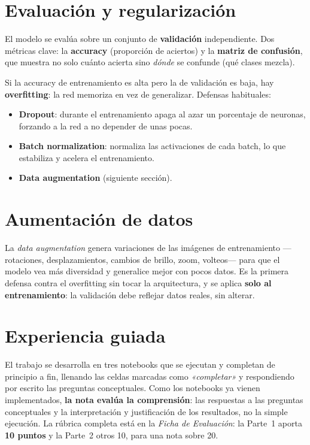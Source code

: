 \section{Evaluación y regularización}

El modelo se evalúa sobre un conjunto de \textbf{validación} independiente. Dos métricas
clave: la \textbf{accuracy} (proporción de aciertos) y la \textbf{matriz de confusión}, que
muestra no solo cuánto acierta sino \emph{dónde} se confunde (qué clases mezcla).

Si la accuracy de entrenamiento es alta pero la de validación es baja, hay
\textbf{overfitting}: la red memoriza en vez de generalizar. Defensas habituales:

\begin{itemize}
  \item \textbf{Dropout}: durante el entrenamiento apaga al azar un porcentaje de neuronas,
        forzando a la red a no depender de unas pocas.
  \item \textbf{Batch normalization}: normaliza las activaciones de cada batch, lo que
        estabiliza y acelera el entrenamiento.
  \item \textbf{Data augmentation} (siguiente sección).
\end{itemize}

\section{Aumentación de datos}

La \emph{data augmentation} genera variaciones de las imágenes de entrenamiento
---rotaciones, desplazamientos, cambios de brillo, zoom, volteos--- para que el modelo vea
más diversidad y generalice mejor con pocos datos. Es la primera defensa contra el
overfitting sin tocar la arquitectura, y se aplica \textbf{solo al entrenamiento}: la
validación debe reflejar datos reales, sin alterar.

\section{Experiencia guiada}\label{sec:guiada}

El trabajo se desarrolla en tres notebooks que se ejecutan y completan de principio a fin,
llenando las celdas marcadas como \emph{«completar»} y respondiendo por escrito las
preguntas conceptuales. Como los notebooks ya vienen implementados, \textbf{la nota
evalúa la comprensión}: las respuestas a las preguntas conceptuales y la interpretación y
justificación de los resultados, no la simple ejecución. La rúbrica completa está en la
\emph{Ficha de Evaluación}: la Parte~1 aporta \textbf{10 puntos} y la Parte~2 otros 10,
para una nota sobre 20.

